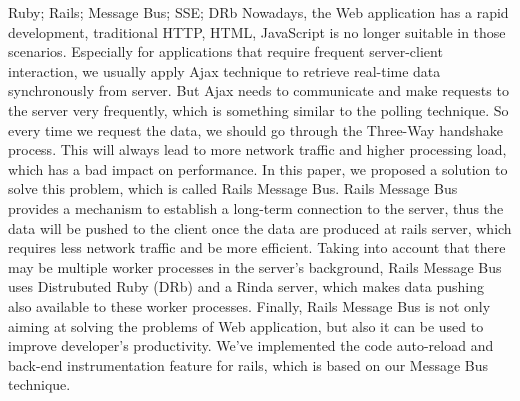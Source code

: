 \makecover


\begin{abstract}{Ruby;  Rails;  消息总线;  SSE;  DRb}
近年来，随着Web应用的快速发展，传统基于HTTP+HTML+JavaScript的网站开发技术在应对这些新场景时已经显出了颓势。特别是对于需要频繁和服务器交互的Web应用，传统上我们一般使用Ajax来从后台异步获取实时数据。但是该技术需要不断的向服务器请求数据，这种类似轮询的方式使得每次请求数据时都得经过“三次握手”等繁琐初始化过程，这既带来了较高的网络流量又引发了较大的处理负荷，从而影响了执行效率。
针对Rails服务器，本文提出了一种可行的解决技术，称之为Rails消息总线。Rails消息总线技术提供了一种机制，使得浏览器能够通过和服务器建立一个长连接获取数据，这样只要服务器端产生任何数据，都能够实时地推送到浏览器端，减少了不必要的网络流量，提升了处理效率。同时，考虑到服务器后端可能有多个进程进行处理，Rails消息总线技术使用了分布式Ruby（DRb）和Rinda，使得服务器上的后台工作进程亦能够向浏览器发送数据。
最后，Rails消息总线技术不仅仅适用于解决Web应用的难题，同时亦能被用于提升开发者效率。本文利用消息总线技术，简单地实现了Rails服务器在开发模式下代码自动重载以及后端性能评测的两套开发者工具。
\end{abstract}


\begin{abstractEng}{Ruby; Rails; Message Bus; SSE; DRb}
Nowadays, the Web application has a rapid development, traditional HTTP, HTML, JavaScript is no longer suitable in those scenarios. Especially for applications that require frequent server-client interaction, we usually apply Ajax technique to retrieve real-time data synchronously from server. But Ajax needs to communicate and make requests to the server very frequently, which is something similar to the polling technique. So every time we request the data, we should go through the Three-Way handshake process. This will always lead to more network traffic and higher processing load, which has a bad impact on performance.
In this paper, we proposed a solution to solve this problem, which is called Rails Message Bus. Rails Message Bus provides a mechanism to establish a long-term connection to the server, thus the data will be pushed to the client once the data are produced at rails server, which requires less network traffic and be more efficient. Taking into account that there may be multiple worker processes in the server's background, Rails Message Bus uses Distrubuted Ruby (DRb) and a Rinda server, which makes data pushing also available to these worker processes.
Finally, Rails Message Bus is not only aiming at solving the problems of Web application, but also it can be used to improve developer's productivity. We've implemented the code auto-reload and back-end instrumentation feature for rails, which is based on our Message Bus technique.
\end{abstractEng}


\tableofcontents